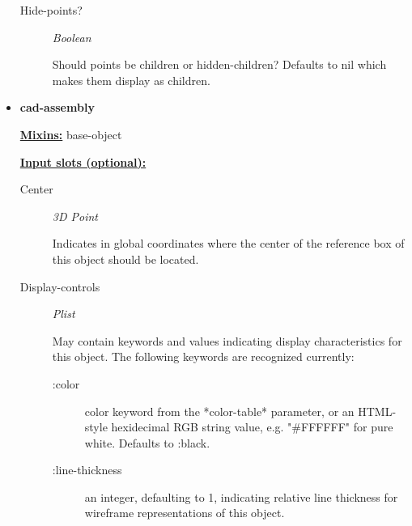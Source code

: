 \documentclass [11pt]{book}
\begin{document}
\begin{itemize}
\begin{description}
\item [Hide-points?]
\emph{Boolean}

 Should points be children or hidden-children?
Defaults to nil which makes them display as children.




\end{description}







\item {}
\label{prim:cad-assembly}
\textbf{cad-assembly}


\textbf{
\underline{Mixins:}} base-object





\begin{description}

\end{description}








\textbf{
\underline{Input slots (optional):}}

\begin{description}

\item [Center]
\emph{3D Point}

 Indicates in global coordinates where the center of the reference
box of this object should be located.




\item [Display-controls]
\emph{Plist}

 May contain keywords and values indicating display characteristics for
this object. The following keywords are recognized currently:



\begin{description}


\item[:color]
 color keyword from the *color-table* parameter, or an HTML-style hexidecimal
RGB string value, e.g. "\#FFFFFF" for pure white. Defaults to :black.


\item[:line-thickness]
 an integer, defaulting to 1, indicating relative line thickness for wireframe
representations of this object.



\end{description}
\end{description}
\end{itemize}
\end{document}
